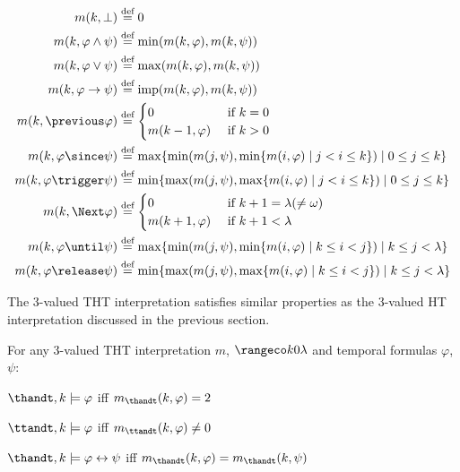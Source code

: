 \begin{align*}
  m(k, \perp) &\defeq 0 \\
  m(k, \varphi \wedge \psi) &\defeq \min (m(k, \varphi), m(k, \psi)) \\
  m(k, \varphi \vee \psi) &\defeq \max (m(k, \varphi), m(k, \psi)) \\
  m(k, \varphi \rightarrow \psi) &\defeq \operatorname{imp}(m(k, \varphi), m(k, \psi)) \\
  m(k, \previous \varphi) &\defeq \begin{cases}
    0 & \text { if } k=0 \\
    m(k-1, \varphi) & \text { if } k>0
  \end{cases} \\
 m(k, \varphi \since \psi) &\defeq \max \{\min (m(j, \psi), \min \{m(i, \varphi) \mid j<i \leq k\}) \mid 0 \leq j \leq k\} \\
 m(k, \varphi \trigger \psi) &\defeq \min \{\max (m(j, \psi), \max \{m(i, \varphi) \mid j<i \leq k\}) \mid 0 \leq j \leq k\} \\
 m(k, \Next \varphi) &\defeq \begin{cases}0 & \text { if } k+1=\lambda(\neq \omega) \\
m(k+1, \varphi) & \text { if } k+1<\lambda\end{cases} \\
 m(k, \varphi \until \psi) &\defeq \max \{\min (m(j, \psi), \min \{m(i, \varphi) \mid k \leq i<j\}) \mid k \leq j<\lambda\} \\
 m(k, \varphi \release \psi) &\defeq \min \{\max (m(j, \psi), \max \{m(i, \varphi) \mid k \leq i<j\}) \mid k \leq j<\lambda\}
\end{align*}

The 3-valued THT interpretation satisfies similar properties as the
3-valued HT interpretation discussed in the previous section.

\begin{proposition}
  For any 3-valued THT interpretation $m$, $\kinlambda$ and temporal
  formulas $\varphi$, $\psi$:
\begin{description}
  \item $\thandt,k \models \varphi$ iff $m_{\thandt}(k,\varphi) = 2$
  \item $\ttandt,k \models \varphi$ iff $m_{\ttandt}(k,\varphi) \neq 0$
  \item $\thandt,k \models \varphi \leftrightarrow \psi$ iff $m_{\thandt}(k,\varphi) = m_{\thandt}(k,\psi)$
\end{description}
\end{proposition}

